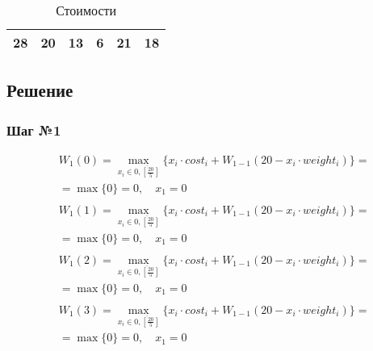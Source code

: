 \documentclass[17pt]{extarticle}
\begin{document}
\begin{table}[H]
    \centering
    \begin{tabular}{|c|c|c|c|c|c|}
        \hline
        28 & 20 & 13 & 6 & 21 & 18 \\
        \hline
    \end{tabular}
    \caption*{Стоимости}
\end{table}
\subsection*{Решение}
\subsubsection*{Шаг №1}
\[
    \begin{aligned}
         & W_1(0)=\max_{x_i \in \overline{0, \left[\frac{20}{5}\right]}} \{x_i \cdot cost_i + W_{1-1}(20 - x_i \cdot weight_i)\}= \\& = \max \{
        0\}= 0, \quad x_1 = 0                                                                                                     \\
    \end{aligned}
\]
\[
    \begin{aligned}
         & W_1(1)=\max_{x_i \in \overline{0, \left[\frac{20}{5}\right]}} \{x_i \cdot cost_i + W_{1-1}(20 - x_i \cdot weight_i)\}= \\& = \max \{
        0\}= 0, \quad x_1 = 0                                                                                                     \\
    \end{aligned}
\]
\[
    \begin{aligned}
         & W_1(2)=\max_{x_i \in \overline{0, \left[\frac{20}{5}\right]}} \{x_i \cdot cost_i + W_{1-1}(20 - x_i \cdot weight_i)\}= \\& = \max \{
        0\}= 0, \quad x_1 = 0                                                                                                     \\
    \end{aligned}
\]
\[
    \begin{aligned}
         & W_1(3)=\max_{x_i \in \overline{0, \left[\frac{20}{5}\right]}} \{x_i \cdot cost_i + W_{1-1}(20 - x_i \cdot weight_i)\}= \\& = \max \{
        0\}= 0, \quad x_1 = 0                                                                                                     \\
    \end{aligned}
\]
\end{document}
